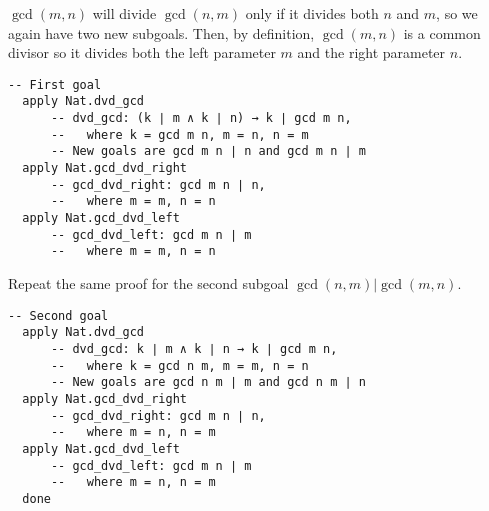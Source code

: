 $\gcd (m,n)$ will divide $\gcd (n,m)$ only if it divides both $n$ and $m$, so we again have two new subgoals. Then, by definition, $\gcd (m,n)$ is a common divisor so it divides both the left parameter $m$ and the right parameter $n$. 

\begin{Verbatim}[firstnumber=last]
  -- First goal
  apply Nat.dvd_gcd
      -- dvd_gcd: (k ∣ m ∧ k ∣ n) → k ∣ gcd m n,
      --   where k = gcd m n, m = n, n = m
      -- New goals are gcd m n ∣ n and gcd m n ∣ m
  apply Nat.gcd_dvd_right
      -- gcd_dvd_right: gcd m n ∣ n,
      --   where m = m, n = n
  apply Nat.gcd_dvd_left
      -- gcd_dvd_left: gcd m n ∣ m
      --   where m = m, n = n
\end{Verbatim}

\pagebreak[3]

Repeat the same proof for the second subgoal $\gcd (n,m) | \gcd (m,n)$.

\begin{Verbatim}[firstnumber=last]
  -- Second goal
  apply Nat.dvd_gcd
      -- dvd_gcd: k ∣ m ∧ k ∣ n → k ∣ gcd m n,
      --   where k = gcd n m, m = m, n = n
      -- New goals are gcd n m ∣ m and gcd n m ∣ n
  apply Nat.gcd_dvd_right
      -- gcd_dvd_right: gcd m n ∣ n,
      --   where m = n, n = m
  apply Nat.gcd_dvd_left
      -- gcd_dvd_left: gcd m n ∣ m
      --   where m = n, n = m
  done
\end{Verbatim}


